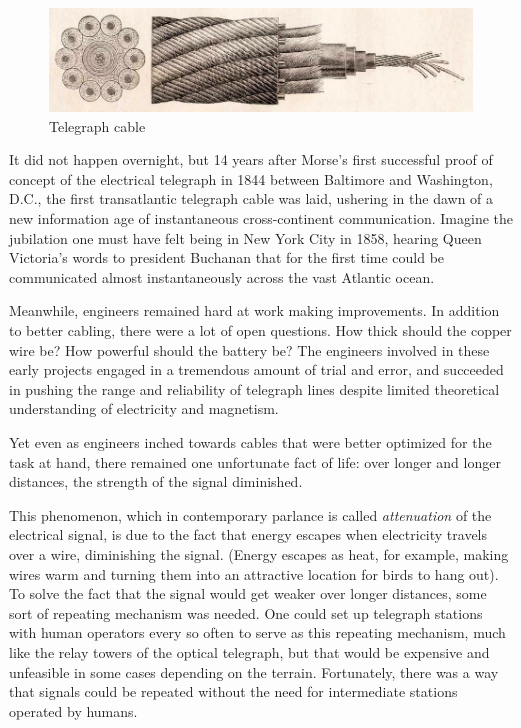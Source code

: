 \documentclass[UTF8]{book}
\begin{document}
\begin{CJK}{UTF8}{gbsn}
\begin{figure}[H]
\centering
\includegraphics[width=0.8\linewidth]{cable-cross-section}
\caption{Telegraph cable}
\end{figure}

It did not happen overnight, but 14 years after Morse's first successful proof of concept of the electrical telegraph in 1844 between Baltimore and Washington, D.C., the first transatlantic telegraph cable was laid, ushering in the dawn of a new information age of instantaneous cross-continent communication. Imagine the jubilation one must have felt being in New York City in 1858, hearing Queen Victoria's words to president Buchanan that for the first time could be communicated almost instantaneously across the vast Atlantic ocean.

Meanwhile, engineers remained hard at work making improvements. In addition to better cabling, there were a lot of open questions. How thick should the copper wire be? How powerful should the battery be? The engineers involved in these early projects engaged in a tremendous amount of trial and error, and succeeded in pushing the range and reliability of telegraph lines despite limited theoretical understanding of electricity and magnetism.

Yet even as engineers inched towards cables that were better optimized for the task at hand, there remained one unfortunate fact of life: over longer and longer distances, the strength of the signal diminished.

This phenomenon, which in contemporary parlance is called \emph{attenuation} of the electrical signal, is due to the fact that energy escapes when electricity travels over a wire, diminishing the signal. (Energy escapes as heat, for example, making wires warm and turning them into an attractive location for birds to hang out). To solve the fact that the signal would get weaker over longer distances, some sort of repeating mechanism was needed. One could set up telegraph stations with human operators every so often to serve as this repeating mechanism, much like the relay towers of the optical telegraph, but that would be expensive and unfeasible in some cases depending on the terrain. Fortunately, there was a way that signals could be repeated without the need for intermediate stations operated by humans.


\end{CJK}
\end{document}
